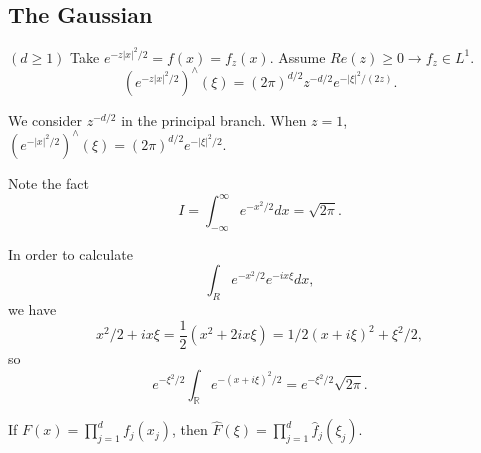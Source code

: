 \documentclass[11pt]{scrartcl}
\newcommand{\R}{\mathbb{R}}
\let \hat \widehat
\newcommand{\<}{\langle}
\renewcommand{\>}{\rangle}
\begin{document}
\subsection{The Gaussian }
\begin{fact}$(d \ge 1)$ Take $e^{-z|x|^2/2} = f(x) = f_z(x)$.  Assume $Re(z) \ge 0 \rightarrow f_z \in L^1$.
$$(e^{-z|x|^2/2})^{\wedge}(\xi) = (2\pi)^{d/2}z^{-d/2}e^{-|\xi|^2/(2z)}.$$
\end{fact}
We consider $z^{-d/2}$ in the principal branch.  When $z=1$, $(e^{-|x|^2/2})^{\wedge}(\xi) = (2\pi)^{d/2}e^{-|\xi|^2/2}.$

Note the fact
$$I = \int_{-\infty}^{\infty} e^{-x^2/2}dx = \sqrt{2\pi}.$$

In order to calculate
$$\int_R e^{-x^2/2}e^{-ix\xi} dx,$$
we have 
$$x^2/2 + ix\xi = \frac{1}{2}(x^2 + 2ix \xi) = 1/2(x + i\xi)^2 + \xi^2/2,$$
so $$e^{-\xi^2/2}\int_{\R} e^{-(x+i\xi)^2/2} = e^{-\xi^2/2}\sqrt{2\pi}.$$

If $F(x) = \prod_{j=1}^d f_j(x_j)$, then $\hat{F}(\xi) = \prod_{j=1}^d \hat{f}_j (\xi_j)$.
\end{document}
